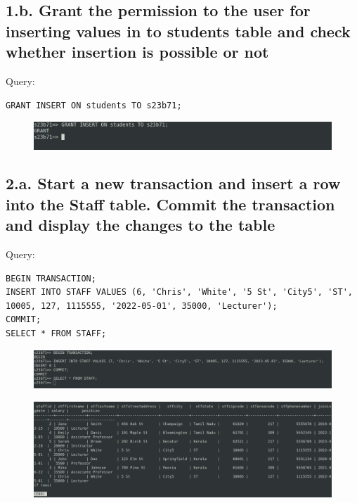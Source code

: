 \documentclass{article}
\begin{document}
\subsection*{1.b. Grant the permission to the user for inserting values in to students table and check whether insertion is possible or not}
Query:
\begin{Verbatim}[frame=single,framerule=1pt,fontfamily=courier,fontsize=\small]
GRANT INSERT ON students TO s23b71;
\end{Verbatim}
\begin{figure}[H]
    \centering
    \includegraphics[width=\textwidth]{cycle4/4.1.2.png}
\end{figure}

\subsection*{2.a. Start a new transaction and insert a row into the Staff table. Commit the transaction and display the changes to the table}
Query:
\begin{Verbatim}[frame=single,framerule=1pt,fontfamily=courier,fontsize=\small]
BEGIN TRANSACTION;
INSERT INTO STAFF VALUES (6, 'Chris', 'White', '5 St', 'City5', 'ST', 
10005, 127, 1115555, '2022-05-01', 35000, 'Lecturer');
COMMIT;
SELECT * FROM STAFF;
\end{Verbatim}
\begin{figure}[H]
    \centering
    \includegraphics[width=\textwidth]{cycle4/4.2.1.png}
\end{figure}
\begin{figure}[H]
    \centering
    \includegraphics[width=\textwidth]{cycle4/4.2.2.png}
\end{figure}
\end{document}
